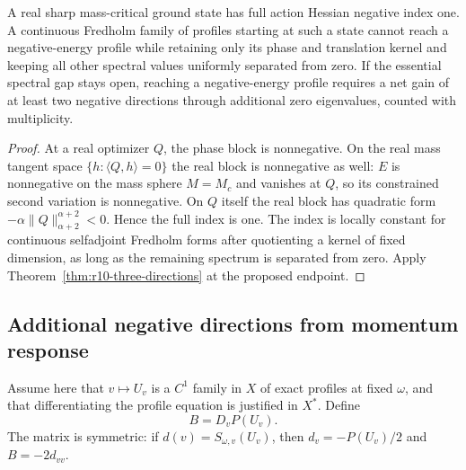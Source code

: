 \begin{corollary}
\label{cor:r10-continuation}
A real sharp mass-critical ground state has full action Hessian
negative index one.  A continuous Fredholm family of profiles starting
at such a state cannot reach a negative-energy profile while retaining
only its phase and translation kernel and keeping all other spectral
values uniformly separated from zero.  If the essential spectral gap
stays open, reaching a negative-energy profile requires a net gain of
at least two negative directions through additional zero eigenvalues,
counted with multiplicity.
\end{corollary}
\begin{proof}
At a real optimizer $Q$, the phase block is nonnegative.  On the real
mass tangent space $\{h:\langle Q,h\rangle=0\}$ the real block is
nonnegative as well: $E$ is nonnegative on the mass sphere
$M=M_c$ and vanishes at $Q$, so its constrained second variation is
nonnegative.  On $Q$ itself the real block has quadratic form
$-\alpha\|Q\|_{\alpha+2}^{\alpha+2}<0$.  Hence the full index is one.
The index is locally constant for continuous selfadjoint Fredholm
forms after quotienting a kernel of fixed dimension, as long as the
remaining spectrum is separated from zero.  Apply
Theorem~\ref{thm:r10-three-directions} at the proposed endpoint.
\end{proof}

\subsection{Additional negative directions from momentum response}

Assume here that $v\mapsto U_v$ is a $C^1$ family in $X$ of exact
profiles at fixed $\omega$, and that differentiating the profile
equation is justified in $X^*$.  Define
\[
 B=D_vP(U_v).
\]
The matrix is symmetric: if $d(v)=S_{\omega,v}(U_v)$, then
$d_v=-P(U_v)/2$ and $B=-2d_{vv}$.


